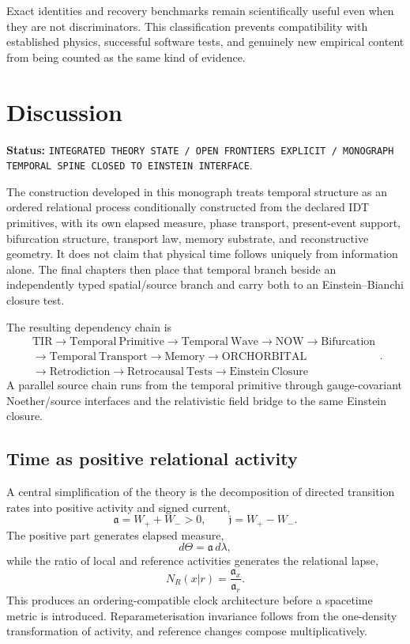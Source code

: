 \documentclass[11pt]{book}
\begin{document}
Exact identities and recovery benchmarks remain scientifically useful even when they are not discriminators. This classification prevents compatibility with established physics, successful software tests, and genuinely new empirical content from being counted as the same kind of evidence.

\chapter{Discussion}

\noindent\textbf{Status:} \texttt{INTEGRATED THEORY STATE / OPEN FRONTIERS EXPLICIT / MONOGRAPH TEMPORAL SPINE CLOSED TO EINSTEIN INTERFACE}.

The construction developed in this monograph treats temporal structure as an ordered relational process conditionally constructed from the declared IDT primitives, with its own elapsed measure, phase transport, present-event support, bifurcation structure, transport law, memory substrate, and reconstructive geometry. It does not claim that physical time follows uniquely from information alone. The final chapters then place that temporal branch beside an independently typed spatial/source branch and carry both to an Einstein--Bianchi closure test.

The resulting dependency chain is
\[
\boxed{
\begin{gathered}
\mathrm{TIR}
\rightarrow
\mathrm{Temporal\ Primitive}
\rightarrow
\mathrm{Temporal\ Wave}
\rightarrow
\mathrm{NOW}
\rightarrow
\mathrm{Bifurcation}
\\
{}\rightarrow
\mathrm{Temporal\ Transport}
\rightarrow
\mathrm{Memory}
\rightarrow
\mathrm{ORCHORBITAL}
\\
{}\rightarrow
\mathrm{Retrodiction}
\rightarrow
\mathrm{Retrocausal\ Tests}
\rightarrow
\mathrm{Einstein\ Closure}
\end{gathered}
}.
\]
A parallel source chain runs from the temporal primitive through gauge-covariant Noether/source interfaces and the relativistic field bridge to the same Einstein closure.

\section{Time as positive relational activity}

A central simplification of the theory is the decomposition of directed transition rates into positive activity and signed current,
\[
\mathfrak a=W_++W_->0,
\qquad
\mathfrak j=W_+-W_-.
\]
The positive part generates elapsed measure,
\[
d\Theta=\mathfrak a\,d\lambda,
\]
while the ratio of local and reference activities generates the relational lapse,
\[
N_R(x|r)=\frac{\mathfrak a_x}{\mathfrak a_r}.
\]
This produces an ordering-compatible clock architecture before a spacetime metric is introduced. Reparameterisation invariance follows from the one-density transformation of activity, and reference changes compose multiplicatively.
\end{document}
